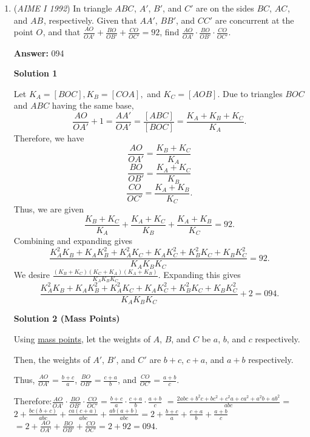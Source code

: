 \begin{enumerate}
We can start how we did above in solution 4 to get$\frac{9}{4} * \sqrt{(81x^2-1)(81-x^2)}$.Then, we can notice the inside is a quadratic in terms of $x^2$, which is$-81(x^2)^2+6562x^2-81$. This is maximized when $x^2 = \frac{3281}{81}$.If we plug it into the equation, we get $\frac{9}{4} \cdot \frac{3280}{9} = \boxed{820}$



	\item (\textit{AIME I 1992}) In triangle $ABC^{}_{}$, $A'$, $B'$, and $C'$ are on the sides $BC$, $AC^{}_{}$, and $AB^{}_{}$, respectively. Given that $AA'$, $BB'$, and $CC'$ are concurrent at the point $O^{}_{}$, and that $\frac{AO^{}_{}}{OA'}+\frac{BO}{OB'}+\frac{CO}{OC'}=92$, find $\frac{AO}{OA'}\cdot \frac{BO}{OB'}\cdot \frac{CO}{OC'}$.


 
 \textbf{Answer: }094



\textbf{Solution 1}

Let $K_A=[BOC], K_B=[COA],$ and $K_C=[AOB].$  Due to triangles $BOC$ and $ABC$ having the same base,  
 \[\frac{AO}{OA'}+1=\frac{AA'}{OA'}=\frac{[ABC]}{[BOC]}=\frac{K_A+K_B+K_C}{K_A}.\]  Therefore, we have
 \[\frac{AO}{OA'}=\frac{K_B+K_C}{K_A}\] 
 \[\frac{BO}{OB'}=\frac{K_A+K_C}{K_B}\] 
 \[\frac{CO}{OC'}=\frac{K_A+K_B}{K_C}.\]Thus, we are given 
 \[\frac{K_B+K_C}{K_A}+\frac{K_A+K_C}{K_B}+\frac{K_A+K_B}{K_C}=92.\] Combining and expanding gives 
 \[\frac{K_A^2K_B+K_AK_B^2+K_A^2K_C+K_AK_C^2+K_B^2K_C+K_BK_C^2}{K_AK_BK_C}=92.\] We desire $\frac{(K_B+K_C)(K_C+K_A)(K_A+K_B)}{K_AK_BK_C}.$ Expanding this gives 
 \[\frac{K_A^2K_B+K_AK_B^2+K_A^2K_C+K_AK_C^2+K_B^2K_C+K_BK_C^2}{K_AK_BK_C}+2=\boxed{094}.\]




\textbf{Solution 2 (Mass Points)}

Using \href{https://artofproblemsolving.com/wiki/index.php?title=Mass\_points}{mass points}, let the weights of $A$, $B$, and $C$ be $a$, $b$, and $c$ respectively. 

 Then, the weights of $A'$, $B'$, and $C'$ are $b+c$, $c+a$, and $a+b$ respectively. 

 Thus, $\frac{AO^{}_{}}{OA'} = \frac{b+c}{a}$, $\frac{BO^{}_{}}{OB'} = \frac{c+a}{b}$, and $\frac{CO^{}_{}}{OC'} = \frac{a+b}{c}$.

 Therefore:$\frac{AO}{OA'}\cdot \frac{BO}{OB'}\cdot \frac{CO}{OC'} = \frac{b+c}{a} \cdot \frac{c+a}{b} \cdot \frac{a+b}{c}$ $= \frac{2abc+b^2c+bc^2+c^2a+ca^2+a^2b+ab^2}{abc} =$
$2+\frac{bc(b+c)}{abc}+\frac{ca(c+a)}{abc}+\frac{ab(a+b)}{abc} = 2 + \frac{b+c}{a} + \frac{c+a}{b} + \frac{a+b}{c}$ $= 2 + \frac{AO^{}_{}}{OA'}+\frac{BO}{OB'}+\frac{CO}{OC'} = 2+92 = \boxed{094}$.


\end{enumerate}
